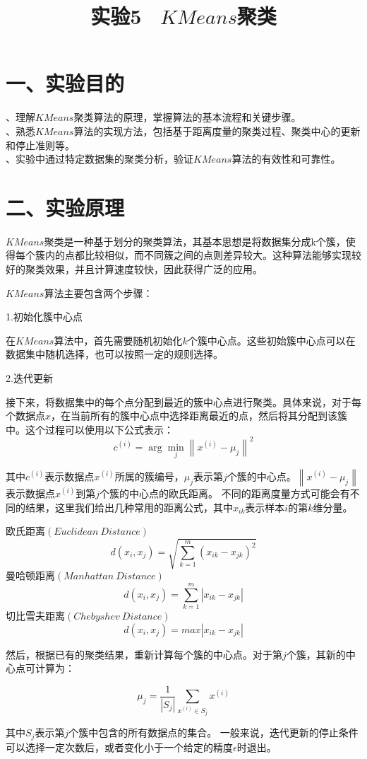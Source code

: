 \documentclass{article}
\begin{document}
\title*{\Huge \centering \vfill \textbf{实验5 \ $KMeans$聚类}}
\section*{\LARGE 一、实验目的}
、理解$KMeans$聚类算法的原理，掌握算法的基本流程和关键步骤。\\
、熟悉$KMeans$算法的实现方法，包括基于距离度量的聚类过程、聚类中心的更新和停止准则等。\\
、实验中通过特定数据集的聚类分析，验证$KMeans$算法的有效性和可靠性。\\

\section*{\LARGE 二、实验原理}
$KMeans$聚类是一种基于划分的聚类算法，其基本思想是将数据集分成k个簇，使得每个簇内的点都比较相似，而不同簇之间的点则差异较大。这种算法能够实现较好的聚类效果，并且计算速度较快，因此获得广泛的应用。

$KMeans$算法主要包含两个步骤：

1.初始化簇中心点

在$KMeans$算法中，首先需要随机初始化$k$个簇中心点。这些初始簇中心点可以在数据集中随机选择，也可以按照一定的规则选择。

2.迭代更新

接下来，将数据集中的每个点分配到最近的簇中心点进行聚类。具体来说，对于每个数据点$x$，在当前所有的簇中心点中选择距离最近的点，然后将其分配到该簇中。这个过程可以使用以下公式表示：
$$
c^{(i)}=\arg \min _{j}\left\|x^{(i)}-\mu_{j}\right\|^{2}
$$

其中$c^{(i)}$表示数据点$x^{(i)}$所属的簇编号，$\mu_j$表示第$j$个簇的中心点。$\left\|x^{(i)}-\mu_{j}\right\|$表示数据点$x^{(i)}$到第$j$个簇的中心点的欧氏距离。
不同的距离度量方式可能会有不同的结果，这里我们给出几种常用的距离公式，其中$x_{ik}$表示样本$i$的第$k$维分量。

欧氏距离$(Euclidean\ Distance)$
$$d(x_i,x_j)=\sqrt{\sum_{k=1}^m(x_{ik}-x_{jk})^2}$$
\indent 曼哈顿距离$(Manhattan\ Distance)$
$$d(x_i,x_j)={\sum_{k=1}^m|x_{ik}-x_{jk}|}$$
\indent 切比雪夫距离$(Chebyshev\ Distance)$
$$d(x_i,x_j)=max |x_{ik}-x_{jk}|$$

然后，根据已有的聚类结果，重新计算每个簇的中心点。对于第$j$个簇，其新的中心点可计算为：

$$
\mu_{j}=\frac{1}{\left|S_{j}\right|} \sum_{x^{(i)} \in S_{j}} x^{(i)}
$$

其中$S_j$表示第$j$个簇中包含的所有数据点的集合。
一般来说，迭代更新的停止条件可以选择一定次数后，或者变化小于一个给定的精度$\epsilon$时退出。
\end{document}
